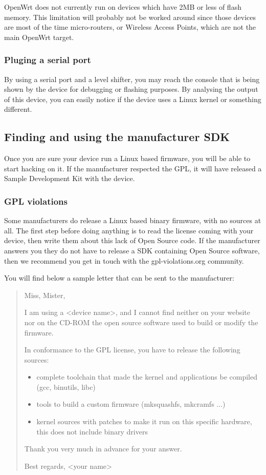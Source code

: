 OpenWrt does not currently run on devices which have 2MB or less of flash memory.
This limitation will probably not be worked around since those devices are most 
of the time micro-routers, or Wireless Access Points, which are not the main 
OpenWrt target.

\subsubsection{Pluging a serial port}

By using a serial port and a level shifter, you may reach the console that is being shown by the device
for debugging or flashing purposes. By analysing the output of this device, you can
easily notice if the device uses a Linux kernel or something different.

\subsection{Finding and using the manufacturer SDK}

Once you are sure your device run a Linux based firmware, you will be able to start
hacking on it. If the manufacturer respected the GPL, it will have released a Sample
Development Kit with the device.

\subsubsection{GPL violations}

Some manufacturers do release a Linux based binary firmware, with no sources at all.
The first step before doing anything is to read the license coming with your device,
then write them about this lack of Open Source code. If the manufacturer answers
you they do not have to release a SDK containing Open Source software, then we 
recommend you get in touch with the gpl-violations.org community.

You will find below a sample letter that can be sent to the manufacturer:

\begin{verse}
Miss, Mister,

I am using a <device name>, and I cannot find neither on your website nor on the 
CD-ROM the open source software used to build or modify the firmware.

In conformance to the GPL license, you have to release the following sources:

\begin{itemize}
\item complete toolchain that made the kernel and applications be compiled (gcc, binutils, libc)
\item tools to build a custom firmware (mksquashfs, mkcramfs ...)
\item kernel sources with patches to make it run on this specific hardware, this does not include binary drivers
\end{itemize}

Thank you very much in advance for your answer.

Best regards, <your name>
\end{verse}


